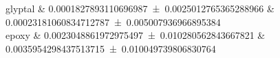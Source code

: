 glyptal 		&		\num{0.0001827893110696987 \pm 0.0025012765365288966} 		&		\num{0.00023181060834712787 \pm 0.005007936966895384}	 \\ 
epoxy 		&		\num{0.0023048861972975497 \pm 0.010280562843667821} 		&		\num{0.0035954298437513715 \pm 0.010049739806830764}	 \\ 
